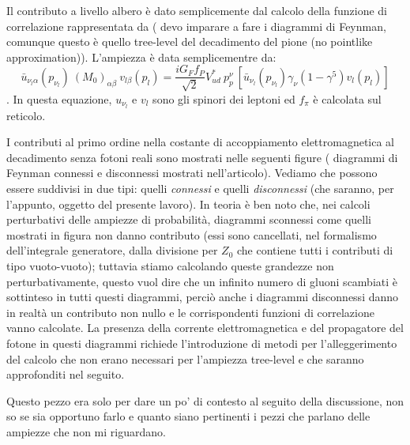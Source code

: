 \documentclass[LaM]{sapthesis}
\begin{document}
	Il contributo a livello albero è dato semplicemente dal calcolo della funzione di correlazione rappresentata da (\color{blue} devo imparare a fare i diagrammi di Feynman, comunque questo è quello tree-level del decadimento del pione (no pointlike approximation)\color{black}). L'ampiezza è data semplicementre da:
	\begin{equation}
		\bar{u}_{\nu_l  \alpha} (p_{\nu_l}) \ (M_0)_{\alpha\beta} \ v_{l  \beta}(p_l) = \frac{iG_Ff_P}{\sqrt{2}}V^*_{ud} \ p^\nu_p \ [\bar{u}_{\nu_l} (p_{\nu_l})\gamma_\nu(1-\gamma^5)v_l(p_l)]
	\end{equation}.
	In questa equazione, ${u}_{\nu_l}$ e $v_l$ sono gli spinori dei leptoni ed $f_\pi$ è calcolata sul reticolo.
	
	I contributi al primo ordine nella costante di accoppiamento elettromagnetica al decadimento senza fotoni reali sono mostrati nelle seguenti figure (\color{green} diagrammi di Feynman connessi e disconnessi mostrati nell'articolo\color{black}). Vediamo che possono essere suddivisi in due tipi: quelli \emph{connessi} e quelli \emph{disconnessi} (che saranno, per l'appunto, oggetto del presente lavoro). In teoria è ben noto che, nei calcoli perturbativi delle ampiezze di probabilità, diagrammi sconnessi come quelli mostrati in figura non danno contributo (essi sono cancellati, nel formalismo dell'integrale generatore, dalla divisione per $Z_0$ che contiene tutti i contributi di tipo vuoto-vuoto); tuttavia stiamo calcolando queste grandezze non perturbativamente, questo vuol dire che un infinito numero di gluoni scambiati è sottinteso in tutti questi diagrammi, perciò anche i diagrammi disconnessi danno in realtà un contributo non nullo e le corrispondenti funzioni di correlazione vanno calcolate. La presenza della corrente elettromagnetica e del propagatore del fotone in questi diagrammi richiede l'introduzione di metodi per l'alleggerimento del calcolo che non erano necessari per l'ampiezza tree-level e che saranno approfonditi nel seguito.
	
	\color{magenta} Questo pezzo era solo per dare un po' di contesto al seguito della discussione, non so se sia opportuno farlo e quanto siano pertinenti i pezzi che parlano delle ampiezze che non mi riguardano.\color{black}
	
\end{document}
